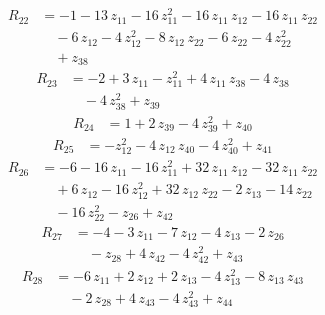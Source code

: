 \begin{equation*}\begin{aligned}
R_{22}&=-1 -13\,z_{11} -16\,z_{11}^{2} -16\,z_{11}\,z_{12} -16\,z_{11}\,z_{22} \\
&\quad -6\,z_{12} -4\,z_{12}^{2} -8\,z_{12}\,z_{22} -6\,z_{22} -4\,z_{22}^{2} \\
&\quad +z_{38}
\end{aligned}\end{equation*}
\begin{equation*}\begin{aligned}
R_{23}&=-2 +3\,z_{11} -z_{11}^{2} +4\,z_{11}\,z_{38} -4\,z_{38} \\
&\quad -4\,z_{38}^{2} +z_{39}
\end{aligned}\end{equation*}
\begin{equation*}\begin{aligned}
R_{24}&=1 +2\,z_{39} -4\,z_{39}^{2} +z_{40}
\end{aligned}\end{equation*}
\begin{equation*}\begin{aligned}
R_{25}&=-z_{12}^{2} -4\,z_{12}\,z_{40} -4\,z_{40}^{2} +z_{41}
\end{aligned}\end{equation*}
\begin{equation*}\begin{aligned}
R_{26}&=-6 -16\,z_{11} -16\,z_{11}^{2} +32\,z_{11}\,z_{12} -32\,z_{11}\,z_{22} \\
&\quad +6\,z_{12} -16\,z_{12}^{2} +32\,z_{12}\,z_{22} -2\,z_{13} -14\,z_{22} \\
&\quad -16\,z_{22}^{2} -z_{26} +z_{42}
\end{aligned}\end{equation*}
\begin{equation*}\begin{aligned}
R_{27}&=-4 -3\,z_{11} -7\,z_{12} -4\,z_{13} -2\,z_{26} \\
&\quad -z_{28} +4\,z_{42} -4\,z_{42}^{2} +z_{43}
\end{aligned}\end{equation*}
\begin{equation*}\begin{aligned}
R_{28}&=-6\,z_{11} +2\,z_{12} +2\,z_{13} -4\,z_{13}^{2} -8\,z_{13}\,z_{43} \\
&\quad -2\,z_{28} +4\,z_{43} -4\,z_{43}^{2} +z_{44}
\end{aligned}\end{equation*}
